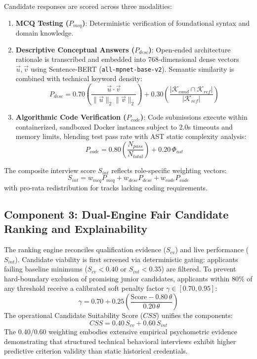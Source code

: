 \documentclass[conference]{IEEEtran}
\begin{document}
Candidate responses are scored across three modalities:
\begin{enumerate}
    \item \textbf{MCQ Testing ($P_{mcq}$)}: Deterministic verification of foundational syntax and domain knowledge.
    \item \textbf{Descriptive Conceptual Answers ($P_{desc}$)}: Open-ended architecture rationale is transcribed and embedded into 768-dimensional dense vectors $\vec{u}, \vec{v}$ using Sentence-BERT (\texttt{all-mpnet-base-v2}). Semantic similarity is combined with technical keyword density:
    \begin{equation}
    P_{desc} = 0.70 \left(\frac{\vec{u} \cdot \vec{v}}{\|\vec{u}\|_2 \|\vec{v}\|_2}\right) + 0.30 \left(\frac{|\mathcal{K}_{cand} \cap \mathcal{K}_{ref}|}{|\mathcal{K}_{ref}|}\right)
    \end{equation}
    \item \textbf{Algorithmic Code Verification ($P_{code}$)}: Code submissions execute within containerized, sandboxed Docker instances subject to 2.0s timeouts and memory limits, blending test pass rate with AST static complexity analysis:
    \begin{equation}
    P_{code} = 0.80 \left(\frac{N_{pass}}{N_{total}}\right) + 0.20\,\Phi_{ast}
    \end{equation}
\end{enumerate}
The composite interview score $S_{int}$ reflects role-specific weighting vectors:
\begin{equation}
S_{int} = w_{mcq} P_{mcq} + w_{desc} P_{desc} + w_{code} P_{code}
\end{equation}
with pro-rata redistribution for tracks lacking coding requirements.

\subsection{Component 3: Dual-Engine Fair Candidate Ranking and Explainability}
The ranking engine reconciles qualification evidence ($S_{cv}$) and live performance ($S_{int}$). Candidate viability is first screened via deterministic gating: applicants failing baseline minimums ($S_{cv} < 0.40$ or $S_{int} < 0.35$) are filtered. To prevent hard-boundary exclusion of promising junior candidates, applicants within 80\% of any threshold receive a calibrated soft penalty factor $\gamma \in [0.70, 0.95]$:
\begin{equation}
\gamma = 0.70 + 0.25 \left(\frac{\text{Score} - 0.80\,\theta}{0.20\,\theta}\right)
\end{equation}
The operational Candidate Suitability Score ($CSS$) unifies the components:
\begin{equation}
CSS = 0.40\,S_{cv} + 0.60\,S_{int}
\end{equation}
The 0.40/0.60 weighting embodies extensive empirical psychometric evidence demonstrating that structured technical behavioral interviews exhibit higher predictive criterion validity than static historical credentials.
\end{document}
